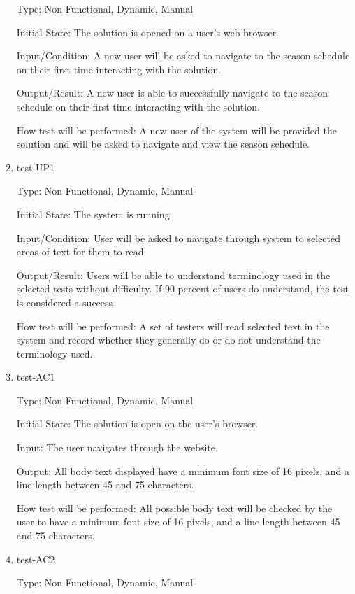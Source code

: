 \documentclass[12pt, titlepage]{article}
\begin{document}
\begin{enumerate}
  Type: Non-Functional, Dynamic, Manual

  Initial State: The solution is opened on a user's web browser.

  Input/Condition: A new user will be asked to navigate to the season schedule on their first
  time interacting with the solution.

  Output/Result: A new user is able to successfully navigate to the season schedule on
  their first time interacting with the solution.

  How test will be performed: A new user of the system will be provided the solution and
  will be asked to navigate and view the season schedule.

  \item{test-UP1\\}

  Type: Non-Functional, Dynamic, Manual

  Initial State: The system is running.

  Input/Condition: User will be asked to navigate through system to 
  selected areas of text for them to read.

  Output/Result: Users will be able to understand terminology used in
  the selected tests without difficulty. If 90 percent of users do understand,
  the test is considered a success.

  How test will be performed: A set of testers will read selected text
  in the system and record whether they generally do or do not 
  understand the terminology used. 

  \item{test-AC1\\}

  Type: Non-Functional, Dynamic, Manual

  Initial State: The solution is open on the user's browser.

  Input: The user navigates through the website. 

  Output: All body text displayed have a minimum font size of 16 
  pixels, and a line length between 45 and 75 characters.

  How test will be performed: All possible body text will be checked by 
  the user to have a minimum font size of 16 pixels, and a line length 
  between 45 and 75 characters.

  \item{test-AC2\\}

  Type: Non-Functional, Dynamic, Manual


\end{enumerate}
\end{document}
